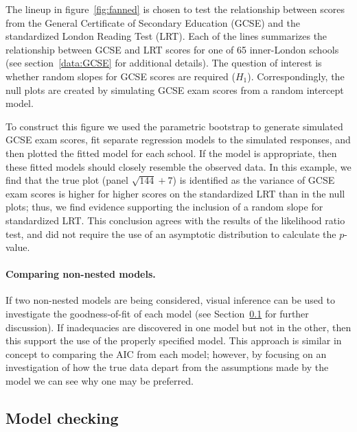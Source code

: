 \documentclass{article} %
\newcommand{\hh}[1]{{\color{orange} #1}}
\begin{document}
\hh{The lineup in figure~\ref{fig:fanned} is chosen to test the relationship between scores from the General Certificate of Secondary Education (GCSE) and the  standardized London Reading Test (LRT).  Each of the lines summarizes the relationship between GCSE  and LRT scores for one of 65  inner-London schools (see section~\ref{data:GCSE} for additional details).}
\hh{The question of interest is whether random slopes for GCSE scores are required ($H_1$). Correspondingly, the null plots  are  created 
by simulating GCSE exam scores from a random intercept model. 
}

 To construct this figure we used the parametric bootstrap to generate simulated GCSE exam scores, fit separate regression models to the simulated responses, and then plotted the fitted model for each school. If the model is appropriate, then these fitted models should closely resemble the observed data. In this example, we find that the true plot (panel $\sqrt{144} + 7$) is identified as the variance of GCSE exam scores is higher for higher scores on the standardized LRT than in the null plots; thus, we find evidence supporting the inclusion of a random slope for standardized LRT. This conclusion agrees with the results of the likelihood ratio test, and did not require the use of an asymptotic distribution to calculate the $p$-value.


\paragraph{Comparing non-nested models.}
If two non-nested models are being considered, visual inference can be used to investigate the goodness-of-fit of each model (see Section~\ref{sec:checking} for further discussion). If inadequacies are discovered in one model but not in the other, then this support the use of the properly specified model. This approach is similar in concept to comparing the AIC from each model; however, by focusing on an investigation of how the true data depart from the assumptions made by the model we can see why one may be preferred.


\subsection{Model checking}\label{sec:checking}
\end{document}
